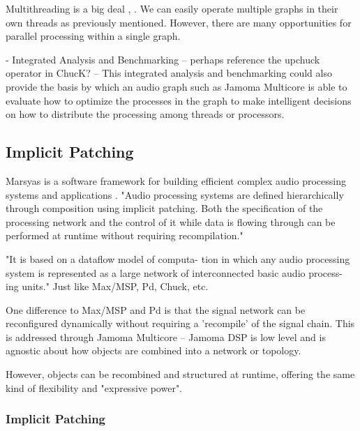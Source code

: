 \documentclass[twoside,a4paper]{article}
\begin{document}



 




Multithreading is a big deal \cite{asanovic2008parallel}, \cite{multicoreICMC08}.  We can easily operate multiple graphs in their own threads as previously mentioned.  However, there are many opportunities for parallel processing within a single graph.

- Integrated Analysis and Benchmarking -- perhaps reference the upchuck operator in ChucK?
   -- This integrated analysis and benchmarking could also provide the basis by which an audio graph such as Jamoma Multicore is able to evaluate how to optimize the processes in the graph to make intelligent decisions on how to distribute the processing among threads or processors.








\subsection{Implicit Patching} %

Marsyas is a software framework for building efficient complex audio processing systems and applications \cite{Tzanetakis:2008}. "Audio processing systems are defined hierarchically through composition using implicit patching. Both the specification of the processing network and the control of it while data is flowing through can be performed at runtime without requiring recompilation."

"It is based on a dataflow model of computa- tion in which any audio processing system is represented as a large network of interconnected basic audio process- ing units."  Just like Max/MSP, Pd, Chuck, etc.

One difference to Max/MSP and Pd is that the signal network can be reconfigured dynamically without requiring a 'recompile' of the signal chain.  This is addressed through Jamoma Multicore -- Jamoma DSP is low level and is agnostic about how objects are combined into a network or topology.

However, objects can be recombined and structured at runtime, offering the same kind of flexibility and "expressive power".

\subsubsection{Implicit Patching}
\end{document}
